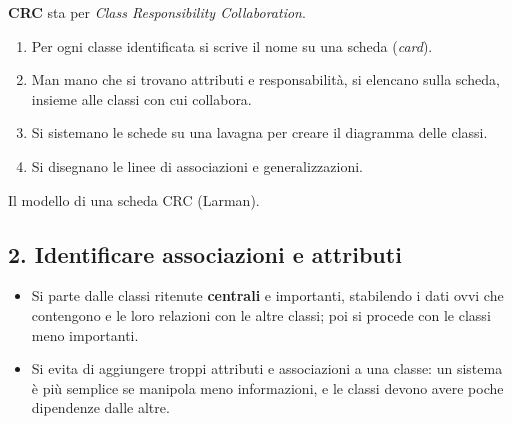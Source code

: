 \noindent\begin{minipage}[c]{0.58\textwidth}
\textbf{CRC} sta per \textit{Class Responsibility Collaboration}.
\begin{enumerate}
  \item Per ogni classe identificata si scrive il nome su una scheda (\textit{card}).
  \item Man mano che si trovano attributi e responsabilità, si elencano sulla scheda, insieme alle classi con cui collabora.
  \item Si sistemano le schede su una lavagna per creare il diagramma delle classi.
  \item Si disegnano le linee di associazioni e generalizzazioni.
\end{enumerate}
\end{minipage}\hfill
\begin{minipage}[c]{0.38\textwidth}
\centering
{}

\scriptsize Il modello di una scheda CRC (Larman).
\end{minipage}


\subsection{2. Identificare associazioni e attributi}

\begin{itemize}
  \item Si parte dalle classi ritenute \textbf{centrali} e importanti, stabilendo i dati ovvi che contengono e le loro relazioni
        con le altre classi; poi si procede con le classi meno importanti.
  \item Si evita di aggiungere troppi attributi e associazioni a una classe: un sistema è più semplice se manipola meno
        informazioni, e le classi devono avere poche dipendenze dalle altre.
\end{itemize}

